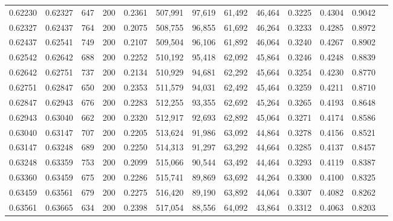 \begin{tabular}{rrrrrrrrrrrrr}
0.62230 & 0.62327 &   647 & 200 &                                     0.2361 & 507,991 &  97,619 &  61,492 &  46,464 & 0.3225 & 0.4304 & 0.9042 \\
0.62327 & 0.62437 &   764 & 200 &                                     0.2075 & 508,755 &  96,855 &  61,692 &  46,264 & 0.3233 & 0.4285 & 0.8972 \\
0.62437 & 0.62541 &   749 & 200 &                                     0.2107 & 509,504 &  96,106 &  61,892 &  46,064 & 0.3240 & 0.4267 & 0.8902 \\
0.62542 & 0.62642 &   688 & 200 &                                     0.2252 & 510,192 &  95,418 &  62,092 &  45,864 & 0.3246 & 0.4248 & 0.8839 \\
0.62642 & 0.62751 &   737 & 200 &                                     0.2134 & 510,929 &  94,681 &  62,292 &  45,664 & 0.3254 & 0.4230 & 0.8770 \\
0.62751 & 0.62847 &   650 & 200 &                                     0.2353 & 511,579 &  94,031 &  62,492 &  45,464 & 0.3259 & 0.4211 & 0.8710 \\
0.62847 & 0.62943 &   676 & 200 &                                     0.2283 & 512,255 &  93,355 &  62,692 &  45,264 & 0.3265 & 0.4193 & 0.8648 \\
0.62943 & 0.63040 &   662 & 200 &                                     0.2320 & 512,917 &  92,693 &  62,892 &  45,064 & 0.3271 & 0.4174 & 0.8586 \\
0.63040 & 0.63147 &   707 & 200 &                                     0.2205 & 513,624 &  91,986 &  63,092 &  44,864 & 0.3278 & 0.4156 & 0.8521 \\
0.63147 & 0.63248 &   689 & 200 &                                     0.2250 & 514,313 &  91,297 &  63,292 &  44,664 & 0.3285 & 0.4137 & 0.8457 \\
0.63248 & 0.63359 &   753 & 200 &                                     0.2099 & 515,066 &  90,544 &  63,492 &  44,464 & 0.3293 & 0.4119 & 0.8387 \\
0.63360 & 0.63459 &   675 & 200 &                                     0.2286 & 515,741 &  89,869 &  63,692 &  44,264 & 0.3300 & 0.4100 & 0.8325 \\
0.63459 & 0.63561 &   679 & 200 &                                     0.2275 & 516,420 &  89,190 &  63,892 &  44,064 & 0.3307 & 0.4082 & 0.8262 \\
0.63561 & 0.63665 &   634 & 200 &                                     0.2398 & 517,054 &  88,556 &  64,092 &  43,864 & 0.3312 & 0.4063 & 0.8203 \\

\end{tabular}
